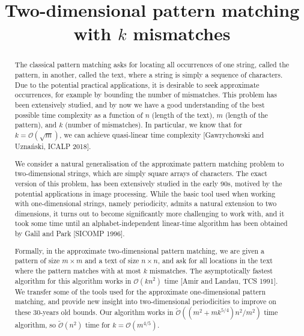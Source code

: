 \documentclass[11pt, letterpaper]{article}
\title{Two-dimensional pattern matching with $k$ mismatches}
\author{}
\theoremstyle{plain}
\theoremstyle{definition}
\theoremstyle{remark}
\renewcommand{\O}{\mathcal{O}}
\newcommand{\tO}{\tilde{\mathcal{O}}}
\begin{document}
\date{}
\maketitle
\thispagestyle{empty}

\begin{abstract}
The classical pattern matching asks for locating all occurrences of one string, called the pattern, in another, called the text, where
a string is simply a sequence of characters.
Due to the potential practical applications, it is desirable to seek approximate occurrences, for example by bounding the number
of mismatches. This problem has been extensively studied, and by now we have a good
understanding of the best possible time complexity as a function of $n$ (length of the text), $m$ (length of the pattern), and $k$
(number of mismatches).
In particular, we know that for $k=\O(\sqrt{m})$, we can achieve quasi-linear time complexity [Gawrychowski and Uznański, ICALP 2018].

We consider a natural generalisation of the approximate pattern matching problem to two-dimensional strings, which are simply
square arrays of characters. The exact version of this problem, has been extensively studied in the early 90s, motived by the
potential applications in image processing. While the basic tool used when working with one-dimensional strings, namely periodicity,
admits a natural extension to two dimensions, it turns out to become significantly more challenging to work with,
and it took some time until an alphabet-independent linear-time algorithm has been obtained by Galil and Park [SICOMP 1996].

Formally, in the approximate two-dimensional pattern matching, we are given a pattern of size $m\times m$ and a text of size $n\times n$,
and ask for all locations in the text where the pattern matches with at most $k$ mismatches.
The asymptotically fastest algorithm for this algorithm works in $\O(kn^{2})$ time [Amir and Landau, TCS 1991].
We transfer some of the tools used for the approximate one-dimensional pattern matching, and provide new insight
into two-dimensional periodicities to improve on these 30-years old bounds.
Our algorithm works in $\tO((m^{2}+mk^{5/4})n^{2}/m^{2})$ time algorithm, so $\tO(n^{2})$ time for $k=\O(m^{4/5})$.
\end{abstract}

\newpage
\end{document}
